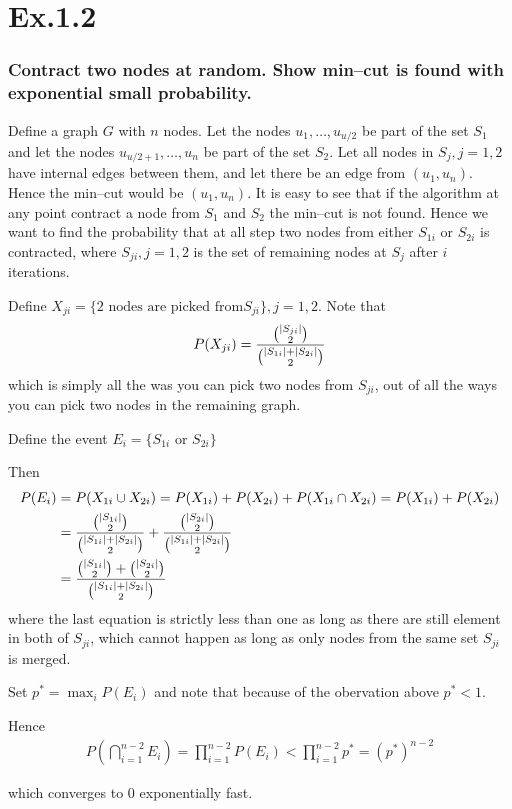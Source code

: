 \section{Ex.1.2}
\subsubsection*{Contract two nodes at random. Show min--cut is found with exponential small probability.}

Define a graph $G$ with $n$ nodes. Let the nodes $u_1,\ldots,u_{u/2}$ be part of the set $S_1$ and let the nodes $u_{u/2+1},\ldots,u_n$ be part of the set $S_2$. Let all nodes in $S_j, j=1,2$ have internal edges between them, and let there be an edge from $(u_1,u_n)$. Hence the min--cut would be $(u_1,u_n)$. It is easy to see that if the algorithm at any point contract a node from $S_1$ and $S_2$ the min--cut is not found. Hence we want to find the probability that at all step two nodes from either $S_{1i}$ or $S_{2i}$ is contracted, where $S_{ji}, j=1,2$ is the set of remaining nodes at $S_j$ after $i$ iterations.

Define $X_{ji} = \{ 2 \text{ nodes are picked from} S_{ji} \}, j=1,2$. Note that 
$$
P(X_{ji}) = \frac{\binom{\lvert S_{ji}\rvert}{2}}{\binom{\lvert S_{1i}\rvert + \lvert S_{2i}\rvert}{2}}
$$ 
which is simply all the was you can pick two nodes from $S_{ji}$, out of all the ways you can pick two nodes in the remaining graph.

Define the event $E_i = \{ S_{1i} \text{ or } S_{2i}\}$

Then
\begin{align*}
P(E_i) &= P(X_{1i} \cup X_{2i}) = P(X_{1i}) + P(X_{2i}) + P(X_{1i} \cap X_{2i}) = P(X_{1i}) + P(X_{2i})\\
&=  \frac{\binom{\lvert S_{1i}\rvert}{2}}{\binom{\lvert S_{1i}\rvert + \lvert S_{2i}\rvert}{2}} + \frac{\binom{\lvert S_{2i}\rvert}{2}}{\binom{\lvert S_{1i}\rvert + \lvert S_{2i}\rvert}{2}}\\
&= \frac{\binom{\lvert S_{1i}\rvert}{2} + \binom{\lvert S_{2i}\rvert}{2}}{\binom{\lvert S_{1i}\rvert + \lvert S_{2i}\rvert}{2}}
\end{align*}
where the last equation is strictly less than one as long as there are still element in both of $S_{ji}$, which cannot happen as long as only nodes from the same set $S_{ji}$ is merged.

Set $p^* = \max_{i} P(E_i)$ and note that because of the obervation above $p^*<1$.

Hence
\begin{align*}
P(\bigcap_{i=1}^{n-2} E_i) = \prod_{i=1}^{n-2}P(E_i) < \prod_{i=1}^{n-2}p^* = (p^*)^{n-2}
\end{align*}

which converges to 0 exponentially fast.
